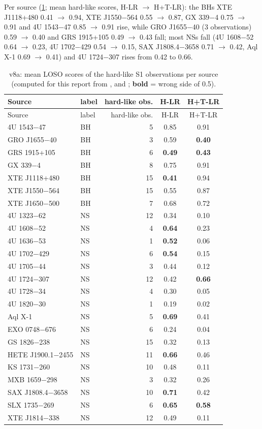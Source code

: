 Per source (\cref{tab:p4v8asrc}; mean hard-like scores, H-LR $\to$ H+T-LR): the BHs XTE J1118+480 0.41 $\to$ 0.94,
XTE J1550$-$564 0.55 $\to$ 0.87, GX 339$-$4 0.75 $\to$ 0.91 and 4U 1543$-$47 0.85 $\to$ 0.91 rise, while GRO J1655$-$40 (3 observations)
0.59 $\to$ 0.40 and GRS 1915+105 0.49 $\to$ 0.43 fall; most NSs fall (4U 1608$-$52 0.64 $\to$ 0.23, 4U 1702$-$429 0.54 $\to$ 0.15,
SAX J1808.4$-$3658 0.71 $\to$ 0.42, Aql X-1 0.69 $\to$ 0.41) and 4U 1724$-$307 rises from 0.42 to 0.66.

{\footnotesize
\begin{longtable}{@{}llrcc@{}}
\caption[Hard-like scores per source]{v8a: mean LOSO scores of the hard-like S1 observations per source (computed for this
report from ,  and
; \textbf{bold} = wrong side of 0.5).}\label{tab:p4v8asrc}\\
\toprule
Source & label & hard-like obs. & H-LR & H+T-LR \\
\midrule\endfirsthead
\toprule Source & label & hard-like obs. & H-LR & H+T-LR \\ \midrule\endhead
\bottomrule\endfoot
4U 1543$-$47 & BH & 5 & 0.85 & 0.91 \\
GRO J1655$-$40 & BH & 3 & 0.59 & \textbf{0.40} \\
GRS 1915+105 & BH & 6 & \textbf{0.49} & \textbf{0.43} \\
GX 339$-$4 & BH & 8 & 0.75 & 0.91 \\
XTE J1118+480 & BH & 15 & \textbf{0.41} & 0.94 \\
XTE J1550$-$564 & BH & 15 & 0.55 & 0.87 \\
XTE J1650$-$500 & BH & 7 & 0.68 & 0.72 \\
4U 1323$-$62 & NS & 12 & 0.34 & 0.10 \\
4U 1608$-$52 & NS & 4 & \textbf{0.64} & 0.23 \\
4U 1636$-$53 & NS & 1 & \textbf{0.52} & 0.06 \\
4U 1702$-$429 & NS & 6 & \textbf{0.54} & 0.15 \\
4U 1705$-$44 & NS & 3 & 0.44 & 0.12 \\
4U 1724$-$307 & NS & 12 & 0.42 & \textbf{0.66} \\
4U 1728$-$34 & NS & 4 & 0.30 & 0.05 \\
4U 1820$-$30 & NS & 1 & 0.19 & 0.02 \\
Aql X-1 & NS & 5 & \textbf{0.69} & 0.41 \\
EXO 0748$-$676 & NS & 6 & 0.24 & 0.04 \\
GS 1826$-$238 & NS & 15 & 0.32 & 0.13 \\
HETE J1900.1$-$2455 & NS & 11 & \textbf{0.66} & 0.46 \\
KS 1731$-$260 & NS & 10 & 0.48 & 0.11 \\
MXB 1659$-$298 & NS & 3 & 0.32 & 0.26 \\
SAX J1808.4$-$3658 & NS & 10 & \textbf{0.71} & 0.42 \\
SLX 1735$-$269 & NS & 6 & \textbf{0.65} & \textbf{0.58} \\
XTE J1814$-$338 & NS & 12 & 0.49 & 0.11 \\
\end{longtable}}

